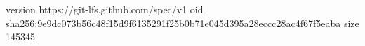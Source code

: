 version https://git-lfs.github.com/spec/v1
oid sha256:9e9dc073b56c48f15d9f6135291f25b0b71e045d395a28eccc28ac4f67f5eaba
size 145345
